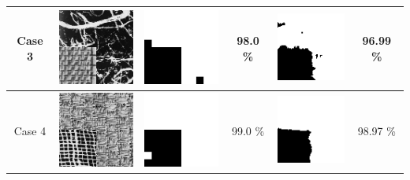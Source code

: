 \documentclass[11pt,twocolumn]{article}
\begin{document}
\begin{table}[ht]
\begin{tabular}{c|c|cc|cc}
\hline
Case 3 & \includegraphics[scale=1]{level03.png} & \includegraphics[scale=1]{level03_method1.png} & 98.0 \% & \includegraphics[scale=1]{level03_method2.png} & 96.99 \% \\
\hline
Case 4 & \includegraphics[scale=1]{level04.png} & \includegraphics[scale=1]{level04_method1.png} & 99.0 \% & \includegraphics[scale=1]{level04_method2.png} & 98.97 \% \\
\hline

\end{tabular}
\end{table}
\end{document}
